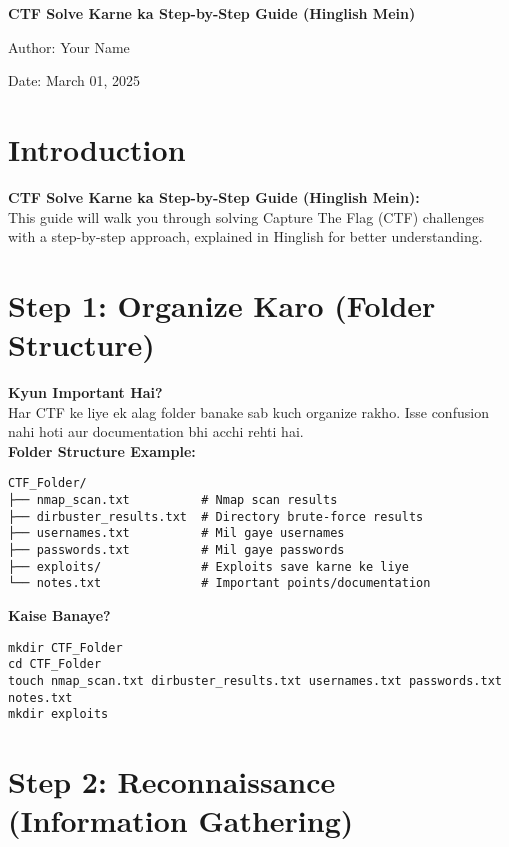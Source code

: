 \documentclass[a4paper]{article}
\begin{document}
\begin{titlepage}
  \centering
  {\Huge\bfseries\color{headingblue} CTF Solve Karne ka Step-by-Step Guide (Hinglish Mein)\par}
  \vspace{2cm}
  {\Large Author: Your Name\par}
  \vspace{1cm}
  {\large Date: March 01, 2025\par}
\end{titlepage}

\section{Introduction}
\textbf{CTF Solve Karne ka Step-by-Step Guide (Hinglish Mein):} \\
This guide will walk you through solving Capture The Flag (CTF) challenges with a step-by-step approach, explained in Hinglish for better understanding.

\section{Step 1: Organize Karo (Folder Structure)}
\textbf{Kyun Important Hai?} \\
Har CTF ke liye ek alag folder banake sab kuch organize rakho. Isse confusion nahi hoti aur documentation bhi acchi rehti hai. \\

\textbf{Folder Structure Example:} \\
\begin{lstlisting}
CTF_Folder/  
├── nmap_scan.txt          # Nmap scan results  
├── dirbuster_results.txt  # Directory brute-force results  
├── usernames.txt          # Mil gaye usernames  
├── passwords.txt          # Mil gaye passwords  
├── exploits/              # Exploits save karne ke liye  
└── notes.txt              # Important points/documentation  
\end{lstlisting}

\textbf{Kaise Banaye?} \\
\begin{lstlisting}
mkdir CTF_Folder  
cd CTF_Folder  
touch nmap_scan.txt dirbuster_results.txt usernames.txt passwords.txt notes.txt  
mkdir exploits  
\end{lstlisting}

\section{Step 2: Reconnaissance (Information Gathering)}
\end{document}
